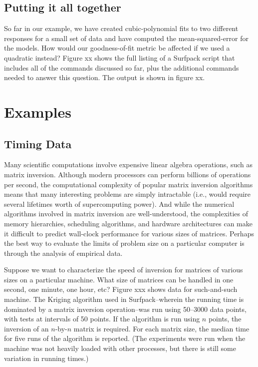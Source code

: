 \documentclass{article}
\begin{document}
\subsection{Putting it all together}
So far in our example, we have created cubic-polynomial fits to two different responses for a small set of data and have computed the mean-squared-error for the models.  How would our goodness-of-fit metric be affected if we used a quadratic instead?  Figure xx shows the full listing of a Surfpack script that includes all of the commands discussed so far, plus the additional commands needed to answer this question. The output is shown in figure xx.


\section{Examples}
\subsection{Timing Data}
Many scientific computations involve expensive linear algebra operations, such as matrix inversion.  Although modern processors can perform billions of operations per second, the computational complexity of popular matrix inversion algorithms means that many interesting problems are simply intractable (i.e., would require several lifetimes worth of supercomputing power).  And while the numerical algorithms involved in matrix inversion are well-understood, the complexities of memory hierarchies, scheduling algorithms, and hardware architectures can make it difficult to predict wall-clock performance for various sizes of matrices.  Perhaps the best way to evaluate the limits of problem size on a particular computer is through the analysis of empirical data.

Suppose we want to characterize the speed of inversion for matrices of various sizes on a particular machine.  What size of matrices can be handled in one second, one minute, one hour, etc?  Figure xxx shows data for such-and-such machine.  The Kriging algorithm used in Surfpack--wherein the running time is dominated by a matrix inversion operation--was run using 50--3000 data points, with tests at intervals of 50 points.  If the algorithm is run using $n$ points, the inversion of an $n$-by-$n$ matrix is required.  For each matrix size, the median time for five runs of the algorithm is reported.  (The experiments were run when the machine was not heavily loaded with other processes, but there is still some variation in running times.)
\end{document}
